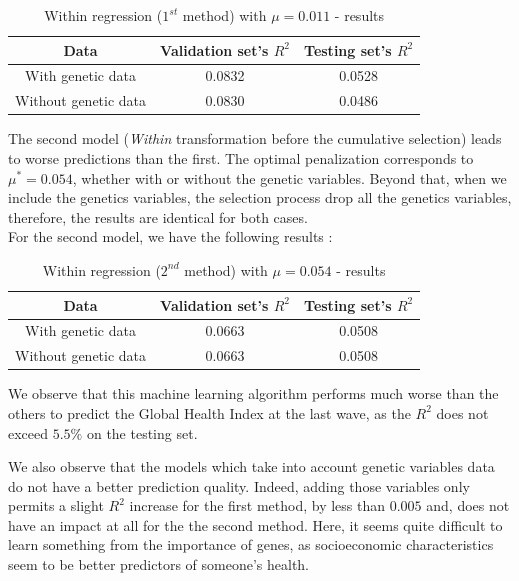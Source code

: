 \documentclass[]{article}
\begin{document}
\begin{table}[!h]
    \centering
    \begin{tabular}{|c|c|c|}
	   \hline
	   \textbf{Data} & \textbf{Validation set's $R^2$} & \textbf{Testing set's $R^2$} \\
	   \hline
	   With genetic data & 0.0832 & 0.0528  \\ 
	   \hline
	   Without genetic data & 0.0830 & 0.0486 \\
	   \hline 
    \end{tabular}
    \caption{Within regression ($1^{st}$ method) with $\mu = 0.011$ - results}
    \label{results_Within_1}
\end{table}


The second model (\textit{Within} transformation before the cumulative selection) leads to worse predictions than the first. The optimal penalization corresponds to $\mu^* = 0.054$, whether with or without the genetic variables. Beyond that, when we include the genetics variables, the selection process drop all the genetics variables, therefore, the results are identical for both cases.\\

For the second model, we have the following results :


\begin{table}[!h]
    \centering
    \begin{tabular}{|c|c|c|}
	   \hline
	   \textbf{Data} & \textbf{Validation set's $R^2$} & \textbf{Testing set's $R^2$} \\
	   \hline
	   With genetic data & 0.0663 & 0.0508  \\ 
	   \hline
	   Without genetic data & 0.0663 & 0.0508 \\
	   \hline 
    \end{tabular}
    \caption{Within regression ($2^{nd}$ method) with $\mu = 0.054$ - results}
    \label{results_Within_1}
\end{table}



We observe that this machine learning algorithm performs much worse than the others to predict the Global Health Index at the last wave, as the $R^2$ does not exceed $5.5\%$ on the testing set.  

We also observe that the models which take into account genetic variables data do not have a better prediction quality. Indeed, adding those variables only permits a slight $R^2$ increase for the first method, by less than $0.005$ and, does not have an impact at all for the the second method. Here, it seems quite difficult to learn something from the importance of genes, as socioeconomic characteristics seem to be better predictors of someone's health.
\end{document}
